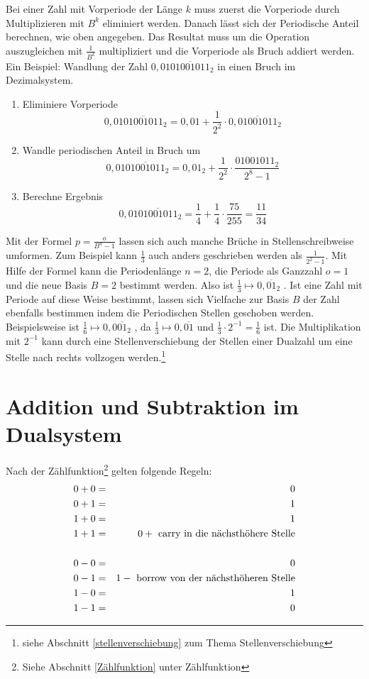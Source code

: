 \documentclass[11pt,a4paper]{scrreprt}
\begin{document}
Bei einer Zahl mit Vorperiode der Länge $k$ muss zuerst die Vorperiode durch Multiplizieren mit $B^k$ eliminiert werden. Danach lässt sich der Periodische Anteil berechnen, wie oben angegeben. Das Resultat muss um die Operation auszugleichen mit $\frac{1}{B^k}$ multipliziert und die Vorperiode als Bruch addiert werden. Ein Beispiel: Wandlung der Zahl $0,01\overline{01001011}_2$ in einen Bruch im Dezimalsystem.
\begin{enumerate}
\item
	Eliminiere Vorperiode
	$$ 0,01\overline{01001011}_2 = 0,01 
		+ \frac{1}{2^2} \cdot 0,\overline{01001011}_2$$

\item
	Wandle periodischen Anteil in Bruch um
	$$ 0,01\overline{01001011}_2 = 0,01_2 
		+ \frac{1}{2^2} \cdot \frac{01001011_2}{2^8 - 1}$$
		
\item
	Berechne Ergebnis
	$$ 0,01\overline{01001011}_2 = \frac{1}{4} 
		+ \frac{1}{4} \cdot \frac{75}{255} = \frac{11}{34}$$
\end{enumerate}

Mit der Formel $p = \frac{o}{B^n - 1}$ lassen sich auch manche Brüche in Stellenschreibweise umformen. Zum Beispiel kann $\frac{1}{3}$ auch anders geschrieben werden als $\frac{1}{2^2 - 1}$. Mit Hilfe der Formel kann die Periodenlänge $n = 2$, die Periode als Ganzzahl $o = 1$ und die neue Basis $B = 2$ bestimmt werden. Also ist $\frac{1}{3} \mapsto 0,\overline{01}_2$ .
Ist eine Zahl mit Periode auf diese Weise bestimmt, lassen sich Vielfache zur Basis $B$ der Zahl ebenfalls bestimmen indem die Periodischen Stellen geschoben werden. Beispielsweise ist $ \frac{1}{6} \mapsto 0,0 \overline{01}_2 $ , da $\frac{1}{3} \mapsto 0, \overline{01} $ und $ \frac{1}{3} \cdot 2^{-1} = \frac{1}{6}$ ist. Die Multiplikation mit $2^{-1}$ kann durch eine Stellenverschiebung der Stellen einer Dualzahl um eine Stelle nach rechts vollzogen werden.\footnote{siehe Abschnitt \ref{stellenverschiebung} zum Thema Stellenverschiebung}  

\section{Addition und Subtraktion im Dualsystem}
Nach der Zählfunktion\footnote{Siehe Abschnitt \ref{Zählfunktion} unter Zählfunktion} gelten folgende Regeln:
\begin{eqnarray*}
	0 + 0 & = & 0 \\
	0 + 1 & = & 1 \\
	1 + 0 & = & 1 \\
	1 + 1 & = & 0 +\textnormal{ carry in die nächsthöhere Stelle}\\ 
	\\
	0 - 0 & = & 0 \\
	0 - 1 & = & 1 -\textnormal{ borrow von der nächsthöheren Stelle}\\
	1 - 0 & = & 1 \\
	1 - 1 & = & 0 \\ 
\end{eqnarray*}
\end{document}
